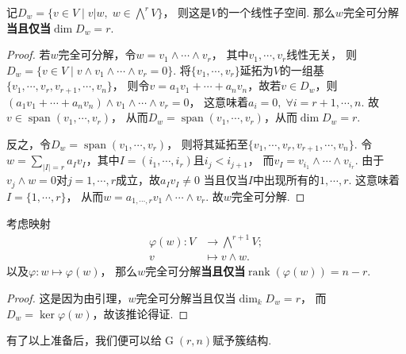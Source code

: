     \begin{lemma}
        记$D_{w}=\{v \in V \mid v | w, \; w \in \bigwedge\nolimits^{r}V\}$，
        则这是$V$的一个线性子空间. 那么$w$完全可分解\textbf{当且仅当}$\dim D_{w} = r$.
    \end{lemma}
    \begin{proof}
        若$w$完全可分解，令$w=v_{1} \wedge \cdots \wedge v_{r}$，
        其中$v_{1},\cdots,v_{r}$线性无关，
        则$D_{w}=\{v \in V \mid v \wedge v_{1} \wedge \cdots \wedge v_{r} =0\}$.
        将$\{v_{1},\cdots,v_{r}\}$延拓为$V$的一组基
        $\{v_{1},\cdots,v_{r},v_{r+1},\cdots,v_{n}\}$，
        则令$v=a_{1}v_{1}+\cdots+a_{n}v_{n}$，故若$v \in D_{w}$，则
        $(a_{1}v_{1}+\cdots+a_{n}v_{n})\wedge v_{1} \wedge \cdots \wedge v_{r}=0$，
        这意味着$a_{i}=0, \; \forall i=r+1,\cdots,n$. 
        故$v \in \operatorname{span}(v_{1},\cdots,v_{r})$，
        从而$D_{w}=\operatorname{span}(v_{1},\cdots,v_{r})$，从而$\dim D_{w}=r$.

        反之，令$D_{w}=\operatorname{span}(v_{1},\cdots,v_{r})$，
        则将其延拓至$\{v_{1},\cdots,v_{r},v_{r+1},\cdots,v_{n}\}$. 
        令
        $w=\sum_{|I|=r}a_{I}v_{I}$，其中$I=(i_{1},\cdots,i_{r})$且$i_{j} < i_{j+1}$，
        而$v_{I}=v_{i_{1}} \wedge \cdots \wedge v_{i_{r}}$.
        由于$v_{j} \wedge w=0$对$j=1,\cdots,r$成立，故$a_{I}v_{I} \neq 0$
        当且仅当$I$中出现所有的$1,\cdots,r$. 这意味着$I=\{1,\cdots,r\}$，
        从而$w=a_{1,\cdots,r}v_{1} \wedge \cdots \wedge v_{r}$. 
        故$w$完全可分解.
    \end{proof}

    \begin{corollary}
        考虑映射
        \begin{equation*}\begin{aligned}
          \varphi(w)\colon V &\longrightarrow \bigwedge\nolimits^{r+1}V;\\
          v &\mapsto v \wedge w.
        \end{aligned}\end{equation*}
        以及$\varphi\colon w \longmapsto \varphi(w)$，
        那么$w$完全可分解\textbf{当且仅当}$\operatorname{rank}(\varphi(w))=n-r$.
    \end{corollary}
    \begin{proof}
        这是因为由引理，$w$完全可分解当且仅当$\dim_{k}D_{w}=r$，
        而$D_{w}=\ker \varphi(w)$，故该推论得证.
    \end{proof}

    有了以上准备后，我们便可以给$\operatorname{G}(r,n)$赋予簇结构.

